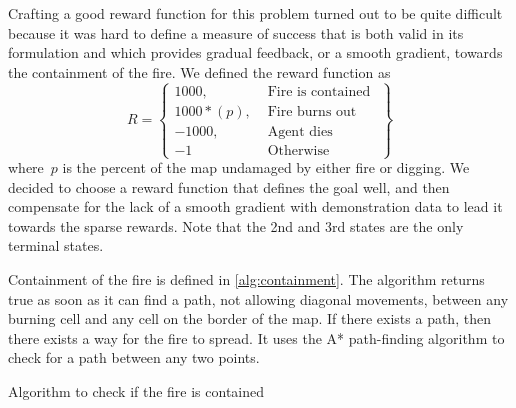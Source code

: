 Crafting a good reward function for this problem turned out to be quite difficult because it was hard to define a measure of success that is both valid in its formulation and which provides gradual feedback, or a smooth gradient, towards the containment of the fire. We defined the reward function as
\[
R = \left\{\begin{array}{lr}
    1000, & \text{ Fire is contained }\\
    1000 * (p), & \text{ Fire burns out }\\
    -1000, & \text{ Agent dies }\\
    -1 & \text{ Otherwise }

    \end{array}\right\}
\]
where~$p$ is the percent of the map undamaged by either fire or digging. We decided to choose a reward function that defines the goal well, and then compensate for the lack of a smooth gradient with demonstration data to lead it towards the sparse rewards. Note that the 2nd and 3rd states are the only terminal states.

Containment of the fire is defined in \ref{alg:containment}. The algorithm returns true as soon as it can find a path, not allowing diagonal movements, between any burning cell and any cell on the border of the map. If there exists a path, then there exists a way for the fire to spread. It uses the A* path-finding algorithm to check for a path between any two points.

\begin{algorithm}
  \caption{Algorithm to check if the fire is contained}
  \label{alg:containment}
  \begin{algorithmic}[1]
    \State {}
    \Else
    \EndIf
    \Else
    \EndIf
    \EndWhile
    \State {}
    \EndProcedure
  \end{algorithmic}
\end{algorithm}



